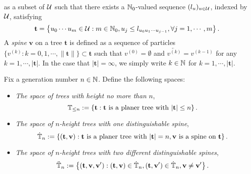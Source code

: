 \documentclass[12pt]{amsart}
\theoremstyle{remark}
\numberwithin{equation}{section}
\newcommand{\defn}[1]{{\em #1}}
\newcommand{\norm}[1]{\left\| #1 \right\|}
\newcommand{\set}[1]{\left\{ #1 \right\}}
\newcommand{\parent}[1]{\overleftarrow{#1}}
\newcommand{\tree}{\mathbf t}
\newcommand{\spine}{\mathbf v}
\begin{document}
as a subset of $\mathcal U$ such that there exists a $\mathbb N_0$-valued sequence $(l_u)_{u\in \mathcal U}$, indexed by $\mathcal U$, satisfying
\begin{equation*}
		\tree
	=
         \set{u_0\cdots u_m\in \cU: m\in \bbN_0, u_j\leq 
          l_{u_0u_1\cdots u_{j-1}}, \forall j=1,\cdots, m}.
\end{equation*}
A \defn{spine} $\spine$ on a  tree $\tree$ 
is defined as a sequence of particles
$\{v^{(k)}:k=0,1,\cdots,\|\tree\|\}\subset\tree$
such that $v^{(0)}=\emptyset$ and $\parent{v^{(k)}}=v^{(k-1)}$ 
for any $k=1,\cdots, |\tree|$. 
In the case that $|\tree|=\infty$, we simply write $k\in\mathbb N$ for
$k=1,\cdots, |\tree|$.
\par
	Fix a generation number $n\in \mathbb N$. Define the following spaces:
\begin{itemize}
\item
\defn{The space of trees with height no more than $n$},
\begin{equation*}
		\bbT_{\leq n}
	:=
	\set{\tree:\tree\text{ is a planer tree with }|\tree|\leq n}.
\end{equation*}
\item
	\defn {The space of $n$-height trees with one distinguishable spine},
\begin{equation*}
		\dot{\bbT}_n
	:=
		\set{(\tree,\spine):\tree \text{ is a planer tree with } |\tree|=n, 
\spine \text{ is a spine on } \tree}.
\end{equation*}
	\item \defn{The space of $n$-height trees with two different distinguishable spines},
\begin{equation*}
		\ddot{\bbT}_n
	:=
		\set{(\tree,\spine,\spine'):(\tree,\spine)\in\dot\bbT_n,(\tree,\spine')\in\dot\bbT_n,\spine\neq\spine'}.
\end{equation*}
\end{itemize}
\end{document}
